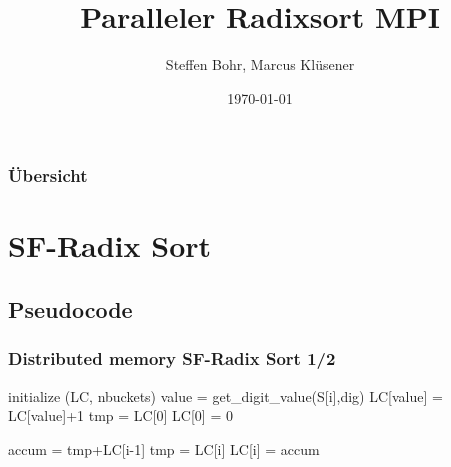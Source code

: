 \documentclass{beamer}
\title[Radixsort MPI]{Paralleler Radixsort MPI} %
\author{Steffen Bohr, Marcus Kl\"usener} %
\institute[HTW-Berlin] %
{
HTW-Berlin \\ %
\medskip
}
\date{\today} %
\begin{document}
\begin{frame}
\titlepage %
\end{frame}

\begin{frame}
\frametitle{\"Ubersicht} %
\tableofcontents %
\end{frame}


\section{SF-Radix Sort} %

\subsection{Pseudocode} %

\begin{frame}
\frametitle{Distributed memory SF-Radix Sort 1/2}
\begin{algorithmic}[1]
	\State initialize (LC, nbuckets)
		\State value = get\_digit\_value(S[i],dig)
		\State LC[value] = LC[value]+1
	\EndFor
	\State tmp = LC[0]
	\State LC[0] = 0

		\State accum = tmp+LC[i-1]
		\State tmp = LC[i]
		\State LC[i] = accum
	\EndFor
\end{algorithmic}
\end{frame}
\end{document}
